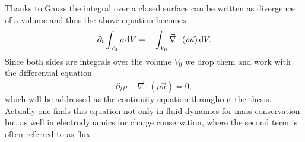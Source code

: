 Thanks to Gauss the integral over a closed surface can be written as divergence of a volume and thus the above equation becomes~\cite{koniglichegesellschaftderwissenschaftenzugottingenCommentationesSocietatisRegiae1811}
\begin{equation}\label{eq:cont_2}
    \partial_t\int_{V_0}\rho\mathop{}\!\mathrm{d} V = -\int_{V_0} \vec{\nabla}\cdot(\rho\vec{u}) \mathop{}\!\mathrm{d} V. 
\end{equation}
Since both sides are integrals over the volume $V_0$ we drop them and work with the differential equation
\begin{equation}\label{eq:cont_3}
    \partial_t\rho + \vec{\nabla}\cdot(\rho\vec{u}) = 0,
\end{equation}
which will be addressed as the continuity equation throughout the thesis.
Actually one finds this equation not only in fluid dynamics for mass conservation but as well in electrodynamics for charge conservation, where the second term is often referred to as flux~\cite{jacksonClassicalElectrodynamics2021, griffithsIntroductionElectrodynamics2013}.

